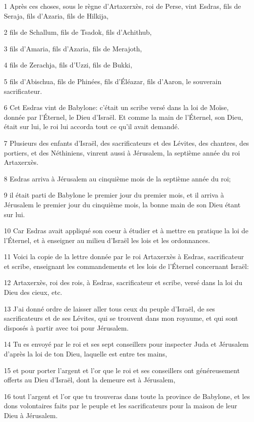 \par 1 Après ces choses, sous le règne d'Artaxerxès, roi de Perse, vint Esdras, fils de Seraja, fils d'Azaria, fils de Hilkija,
\par 2 fils de Schallum, fils de Tsadok, fils d'Achithub,
\par 3 fils d'Amaria, fils d'Azaria, fils de Merajoth,
\par 4 fils de Zerachja, fils d'Uzzi, fils de Bukki,
\par 5 fils d'Abischua, fils de Phinées, fils d'Éléazar, fils d'Aaron, le souverain sacrificateur.
\par 6 Cet Esdras vint de Babylone: c'était un scribe versé dans la loi de Moïse, donnée par l'Éternel, le Dieu d'Israël. Et comme la main de l'Éternel, son Dieu, était sur lui, le roi lui accorda tout ce qu'il avait demandé.
\par 7 Plusieurs des enfants d'Israël, des sacrificateurs et des Lévites, des chantres, des portiers, et des Néthiniens, vinrent aussi à Jérusalem, la septième année du roi Artaxerxès.
\par 8 Esdras arriva à Jérusalem au cinquième mois de la septième année du roi;
\par 9 il était parti de Babylone le premier jour du premier mois, et il arriva à Jérusalem le premier jour du cinquième mois, la bonne main de son Dieu étant sur lui.
\par 10 Car Esdras avait appliqué son coeur à étudier et à mettre en pratique la loi de l'Éternel, et à enseigner au milieu d'Israël les lois et les ordonnances.
\par 11 Voici la copie de la lettre donnée par le roi Artaxerxès à Esdras, sacrificateur et scribe, enseignant les commandements et les lois de l'Éternel concernant Israël:
\par 12 Artaxerxès, roi des rois, à Esdras, sacrificateur et scribe, versé dans la loi du Dieu des cieux, etc.
\par 13 J'ai donné ordre de laisser aller tous ceux du peuple d'Israël, de ses sacrificateurs et de ses Lévites, qui se trouvent dans mon royaume, et qui sont disposés à partir avec toi pour Jérusalem.
\par 14 Tu es envoyé par le roi et ses sept conseillers pour inspecter Juda et Jérusalem d'après la loi de ton Dieu, laquelle est entre tes mains,
\par 15 et pour porter l'argent et l'or que le roi et ses conseillers ont généreusement offerts au Dieu d'Israël, dont la demeure est à Jérusalem,
\par 16 tout l'argent et l'or que tu trouveras dans toute la province de Babylone, et les dons volontaires faits par le peuple et les sacrificateurs pour la maison de leur Dieu à Jérusalem.
